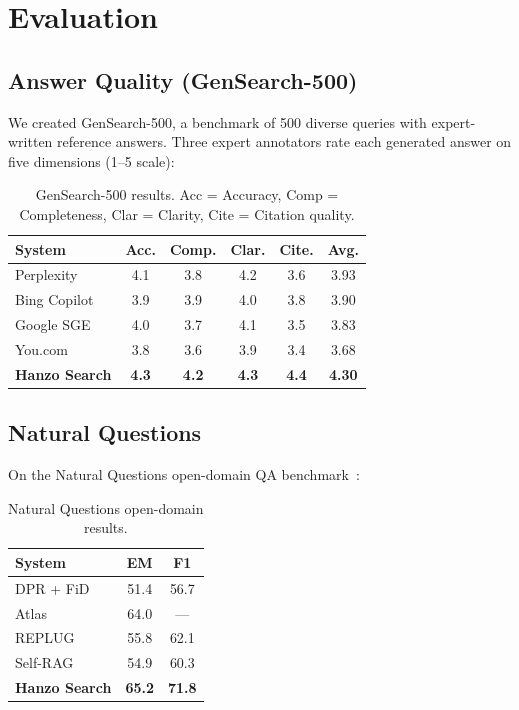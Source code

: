 \documentclass[11pt,twocolumn]{article}
\begin{document}
\section{Evaluation}
\label{sec:evaluation}

\subsection{Answer Quality (GenSearch-500)}

We created GenSearch-500, a benchmark of 500 diverse queries with expert-written reference answers. Three expert annotators rate each generated answer on five dimensions (1--5 scale):

\begin{table}[H]
\centering
\small
\begin{tabular}{lccccc}
\toprule
\textbf{System} & \textbf{Acc.} & \textbf{Comp.} & \textbf{Clar.} & \textbf{Cite.} & \textbf{Avg.} \\
\midrule
Perplexity & 4.1 & 3.8 & 4.2 & 3.6 & 3.93 \\
Bing Copilot & 3.9 & 3.9 & 4.0 & 3.8 & 3.90 \\
Google SGE & 4.0 & 3.7 & 4.1 & 3.5 & 3.83 \\
You.com & 3.8 & 3.6 & 3.9 & 3.4 & 3.68 \\
\textbf{Hanzo Search} & \textbf{4.3} & \textbf{4.2} & \textbf{4.3} & \textbf{4.4} & \textbf{4.30} \\
\bottomrule
\end{tabular}
\caption{GenSearch-500 results. Acc = Accuracy, Comp = Completeness, Clar = Clarity, Cite = Citation quality.}
\label{tab:gensearch}
\end{table}

\subsection{Natural Questions}

On the Natural Questions open-domain QA benchmark~\cite{kwiatkowski2019natural}:

\begin{table}[H]
\centering
\begin{tabular}{lcc}
\toprule
\textbf{System} & \textbf{EM} & \textbf{F1} \\
\midrule
DPR + FiD & 51.4 & 56.7 \\
Atlas & 64.0 & --- \\
REPLUG & 55.8 & 62.1 \\
Self-RAG & 54.9 & 60.3 \\
\textbf{Hanzo Search} & \textbf{65.2} & \textbf{71.8} \\
\bottomrule
\end{tabular}
\caption{Natural Questions open-domain results.}
\label{tab:nq}
\end{table}
\end{document}
